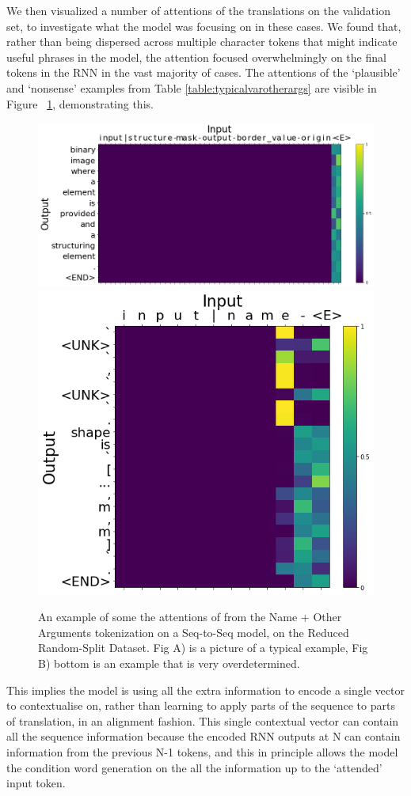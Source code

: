 We then  visualized a number of attentions of the translations on the validation set, to investigate what the model was focusing on in these cases.
We found that, rather than being dispersed across multiple character tokens that might indicate useful phrases in the model, the attention focused overwhelmingly on the final tokens in the RNN in the vast majority of cases.
The attentions of the `plausible' and `nonsense' examples from  Table \ref{table:typicalvarotherargs} are visible in Figure ~\ref{fig:otherarg_attn}, demonstrating this.

\begin{figure}[ht!]
\begin{center}
    \includegraphics[width=0.9\linewidth]{ImagesCodeRelated/attn1pretty.png}
    \includegraphics[width=0.5\linewidth]{ImagesCodeRelated/attn2pretty.png}
    \caption{An example of some the attentions of from the Name + Other Arguments tokenization on a Seq-to-Seq model, on the Reduced Random-Split Dataset. Fig A) is a picture of a typical example, Fig B) bottom is an example that is very overdetermined.}
    \label{fig:otherarg_attn}
\end{center}
\end{figure}

This implies the model is using all the extra information to encode a single vector to contextualise on, rather than learning to apply parts of the sequence to parts of translation, in an alignment fashion.
This single contextual vector can contain all the sequence information because the encoded RNN outputs at N can contain information from the previous N-1 tokens, and this in principle allows the model the condition word generation on the all the information up to the `attended' input token. 

